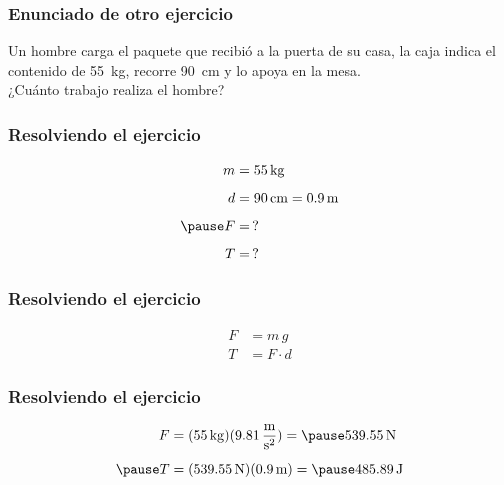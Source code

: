 \documentclass[14pt]{beamer}
\begin{document}
\begin{frame}
\frametitle{Enunciado de otro ejercicio}
Un hombre carga el paquete que recibió a la puerta de su casa, la caja indica el contenido de \SI{55}{\kilo\gram}, recorre \SI{90}{\centi\meter} y lo apoya en la mesa.
\\
\bigskip
\pause
¿Cuánto trabajo realiza el hombre?
\end{frame}
\begin{frame}
\frametitle{Resolviendo el ejercicio}
\pause
\begin{eqnarray*}
\begin{aligned}
m &= \SI{55}{\kilo\gram} \\[0.5em]
d &= \SI{90}{\centi\meter} = \SI{0.9}{\meter} \\[0.5em] \pause
F &= \, ? \\[0.5em]
T &= \, ?
\end{aligned}
\end{eqnarray*}
\end{frame}
\begin{frame}
\frametitle{Resolviendo el ejercicio}
\begin{align*}
F &= m \, g \\[0.5em]
T &= F \cdot d
\end{align*}
\end{frame}
\begin{frame}
\frametitle{Resolviendo el ejercicio}
\begin{eqnarray*}
\begin{aligned}
F &= (\SI{55}{\kilo\gram})(\SI[per-mode=fraction]{9.81}{\meter\per\square\second}) = \pause \SI{539.55}{\newton} \\[0.5em] \pause
T &= (\SI{539.55}{\newton})(\SI{0.9}{\meter}) = \pause \SI{485.89}{\joule}
\end{aligned}
\end{eqnarray*}
\end{frame}
\end{document}
